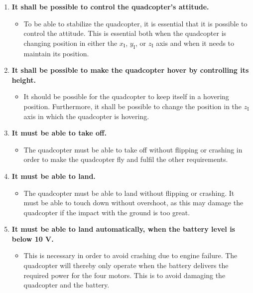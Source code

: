 \begin{enumerate}[label=\textbf{\arabic*})]
\item \textbf{It shall be possible to control the quadcopter's attitude.}
\begin{itemize}
\item[] To be able to stabilize the quadcopter, it is essential that it is possible to control the attitude. This is essential both when the quadcopter is changing position in either the $x_{\mathrm{I}}$, $y_{\mathrm{I}}$, or $z_{\mathrm{I}}$ axis and when it needs to maintain its position.
\end{itemize}


\item \textbf{It shall be possible to make the quadcopter hover by controlling its height.}
\begin{itemize}
\item[] It should be possible for the quadcopter to keep itself in a hovering position. Furthermore, it shall be possible to change the position in the $z_{\mathrm{I}}$ axis in which the quadcopter is hovering.
\end{itemize}


\item \textbf{It must be able to take off.}
\begin{itemize}
\item[]The quadcopter must be able to take off without flipping or crashing in order to make the quadcopter fly and fulfil the other requirements.
\end{itemize}
\newpage
\item \textbf{It must be able to land.}
\begin{itemize}
\item[]The quadcopter must be able to land without flipping or crashing. It must be able to touch down without overshoot, as this may damage the quadcopter if the impact with the ground is too great.
\end{itemize}


\item \textbf{It must be able to land automatically, when the battery level is below 10 V.}
\begin{itemize}
\item[] This is necessary in order to avoid crashing due to engine failure. The quadcopter will thereby only operate when the battery delivers the required power for the four motors. This is to avoid damaging the quadcopter and the battery.
\end{itemize}

\end{enumerate}

